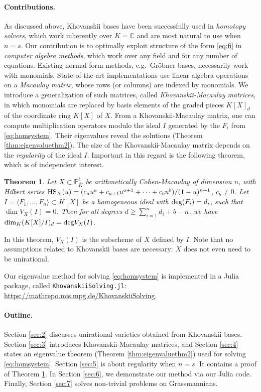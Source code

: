 \documentclass[12pt]{article}
\newtheorem{thm}{Theorem}[section]
\theoremstyle{definition}
\theoremstyle{remark}
\begin{document}
\paragraph{Contributions.} As discussed above, Khovanskii bases have been successfully used in \emph{homotopy solvers}, which work inherently over $K = \mathbb{C}$ and are most natural to use when $n = s$. Our contribution is to optimally exploit structure of the form \eqref{eq:fi} in \emph{computer algebra methods}, which work over any field and for any number of equations. Existing normal form methods, e.g.~Gr\"obner bases, necessarily work with monomials. State-of-the-art implementations use linear algebra operations on a \emph{Macaulay matrix}, whose rows (or columns) are indexed by monomials. We introduce a generalization of such matrices, called \emph{Khovanskii-Macaulay matrices}, in which monomials are replaced by basis elements of the graded pieces $K[X]_d$ of the coordinate ring $K[X]$ of $X$. From a Khovanskii-Macaulay matrix, one can compute multiplication operators modulo the ideal $I$ generated by the $F_i$ from \eqref{eq:homsystem}. Their eigenvalues reveal the solutions (Theorem \ref{thm:eigenvaluethm2}). 
The size of the Khovanskii-Macaulay matrix depends on the \emph{regularity} of the ideal $I$. Important in this regard is the following theorem, which is of independent interest. 
\begin{thm} \label{thm:intro}
    Let $X \subset \mathbb{P}^\ell_{\overline{K}}$ 
    be arithmetically Cohen-Macaulay of dimension $n$, with Hilbert series ${\rm HS}_X(u) = (c_a u^a + c_{a+1}u^{a+1} + \cdots + c_b u^b)/(1-u)^{n+1}$, $c_b \neq 0$. Let $I = \langle F_1, \ldots, F_n \rangle \subset K[X]$ be a homogeneous ideal with ${\rm deg}(F_i) = d_i$, such that $\dim V_X(I) = 0$. Then for all degrees $d \geq \sum_{i=1}^n d_i + b - n$, we have $\dim_K (K[X]/I)_d = {\rm deg} V_X(I)$.
\end{thm}
\noindent In this theorem, $V_X(I)$ is the subscheme of $X$ defined by $I$. Note that no assumptions related to Khovanskii bases are necessary: $X$ does not even need to be unirational. 

Our eigenvalue method for solving \eqref{eq:homsystem} is implemented in a Julia package, called \texttt{KhovanskiiSolving.jl}: \url{https://mathrepo.mis.mpg.de/KhovanskiiSolving}. 

\paragraph{Outline.} Section \ref{sec:2} discusses unirational varieties obtained from Khovanskii bases.  Section \ref{sec:3} introduces Khovanskii-Macaulay matrices, and Section \ref{sec:4} states an eigenvalue theorem (Theorem \ref{thm:eigenvaluethm2}) used for solving \eqref{eq:homsystem}. Section \ref{sec:5} is about regularity when $n = s$. It contains a proof of Theorem \ref{thm:intro}. In Section \ref{sec:6}, we demonstrate our method via our Julia code. Finally, Section \ref{sec:7} solves non-trivial problems on Grassmannians.  
\end{document}
